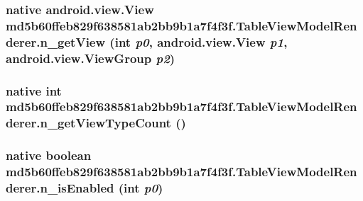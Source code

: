 \hypertarget{classmd5b60ffeb829f638581ab2bb9b1a7f4f3f_1_1_table_view_model_renderer_d6d4f8ac83d1e67037a1478876267cb2}{
\subsubsection[{n\_\-getView}]{\setlength{\rightskip}{0pt plus 5cm}native android.view.View md5b60ffeb829f638581ab2bb9b1a7f4f3f.TableViewModelRenderer.n\_\-getView (int {\em p0}, \/  android.view.View {\em p1}, \/  android.view.ViewGroup {\em p2})}}
\label{classmd5b60ffeb829f638581ab2bb9b1a7f4f3f_1_1_table_view_model_renderer_d6d4f8ac83d1e67037a1478876267cb2}


\hypertarget{classmd5b60ffeb829f638581ab2bb9b1a7f4f3f_1_1_table_view_model_renderer_1d2bbf52da896006bc3a9b6c93c86496}{
\subsubsection[{n\_\-getViewTypeCount}]{\setlength{\rightskip}{0pt plus 5cm}native int md5b60ffeb829f638581ab2bb9b1a7f4f3f.TableViewModelRenderer.n\_\-getViewTypeCount ()}}
\label{classmd5b60ffeb829f638581ab2bb9b1a7f4f3f_1_1_table_view_model_renderer_1d2bbf52da896006bc3a9b6c93c86496}


\hypertarget{classmd5b60ffeb829f638581ab2bb9b1a7f4f3f_1_1_table_view_model_renderer_7b449214bcb7dcbee8c9881e873e6a3e}{
\subsubsection[{n\_\-isEnabled}]{\setlength{\rightskip}{0pt plus 5cm}native boolean md5b60ffeb829f638581ab2bb9b1a7f4f3f.TableViewModelRenderer.n\_\-isEnabled (int {\em p0})}}
\label{classmd5b60ffeb829f638581ab2bb9b1a7f4f3f_1_1_table_view_model_renderer_7b449214bcb7dcbee8c9881e873e6a3e}




